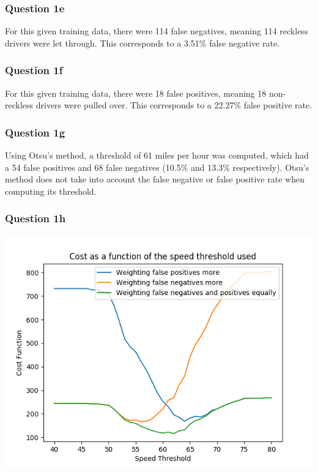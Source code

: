 \documentclass{math}
\begin{document}
\subsubsection*{Question 1e}
For this given training data, there were 114 false negatives, meaning 114
reckless drivers were let through. This corresponds to a 3.51\% false negative
rate.

\subsubsection*{Question 1f}
For this given training data, there were 18 false positives, meaning 18
non-reckless drivers were pulled over. This corresponds to a 22.27\% false
positive rate.

\subsubsection*{Question 1g}
Using Otsu's method, a threshold of 61 miles per hour was computed, which had
a 54 false positives and 68 false negatives (10.5\% and 13.3\% respectively).
Otsu's method does not take into account the false negative or false positive
rate when computing its threshold.

\subsubsection*{Question 1h}
\begin{center}
  \includegraphics[width=16cm]{assets/hw_02_cost_vs_threshold.png}
\end{center}
\end{document}
